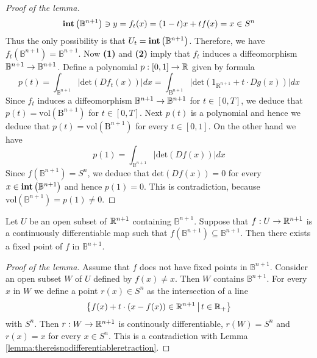 \documentclass[10pt]{amsart}
\begin{document}
\begin{proof}[Proof of the lemma]
$$\mathbf{int}\left(\mathbb{B}^{n+1}\right) \ni y = f_t(x) = (1-t)x + tf(x) = x \in S^n$$
Thus the only possibility is that $U_t = \mathbf{int}\left(\mathbb{B}^{n+1}\right)$. Therefore, we have $f_t(\mathbb{B}^{n+1}) = \mathbb{B}^{n+1}$. Now \textbf{(1)} and \textbf{(2)} imply that $f_t$ induces a diffeomorphism $\mathbb{B}^{n+1}\rightarrow \mathbb{B}^{n+1}$. Define a polynomial $p:[0,1]\rightarrow {\mathbb R}$ given by formula
$$p(t) = \int_{\mathbb{B}^{n+1}}\big|\mathrm{det}\left(Df_t(x)\right)\big|dx = \int_{\mathrm{B}^{n+1}}\big|\mathrm{det}\left(1_{\mathrm{R}^{n+1}} + t\cdot Dg(x)\right)\big|dx$$
Since $f_t$ induces a diffeomorphism $\mathbb{B}^{n+1}\rightarrow \mathbb{B}^{n+1}$ for $t\in [0,T]$, we deduce that $p(t) = \mathrm{vol}\left(\mathrm{B}^{n+1}\right)$ for $t\in [0,T]$. Next $p(t)$ is a polynomial and hence we deduce that $p(t) = \mathrm{vol}\left(\mathrm{B}^{n+1}\right)$ for every $t\in [0,1]$. On the other hand we have
$$p(1) = \int_{\mathbb{B}^{n+1}}\big|\mathrm{det}\left(Df(x)\right)\big|dx$$
Since $f(\mathbb{B}^{n+1}) = S^n$, we deduce that $\mathrm{det}\left(Df(x)\right)=0$ for every $x\in \mathbf{int}\left(\mathbb{B}^{n+1}\right)$ and hence $p(1) = 0$. This is contradiction, because $\mathrm{vol}\left(\mathbb{B}^{n+1}\right) = p(1) \neq 0$.
\end{proof}

\begin{lemma}\label{lemma:everycontinuouslydifferentiableadmitsafixedpoint}
Let $U$ be an open subset of ${\mathbb R}^{n+1}$ containing $\mathbb{B}^{n+1}$. Suppose that $f:U\rightarrow {\mathbb R}^{n+1}$ is a continuously differentiable map such that $f(\mathbb{B}^{n+1})\subseteq \mathbb{B}^{n+1}$. Then there exists a fixed point of $f$ in $\mathbb{B}^{n+1}$.
\end{lemma}
\begin{proof}[Proof of the lemma]
Assume that $f$ does not have fixed points in $\mathbb{B}^{n+1}$. Consider an open subset $W$ of $U$ defined by $f(x) \neq x$. Then $W$ contains $\mathbb{B}^{n+1}$. For every $x$ in $W$ we define a point $r(x)\in S^n$ as the intersection of a line
$$\big\{f(x) + t\cdot \left(x - f(x)\right)\in {\mathbb R}^{n+1}\,\big|\,t\in {\mathbb R}_+\big\}$$
with $S^n$. Then $r:W\rightarrow {\mathbb R}^{n+1}$ is continously differentiable, $r(W) = S^n$ and $r(x) = x$ for every $x\in S^n$. This is a contradiction with Lemma \ref{lemma:thereisnodifferentiableretraction}.
\end{proof}
\end{document}
